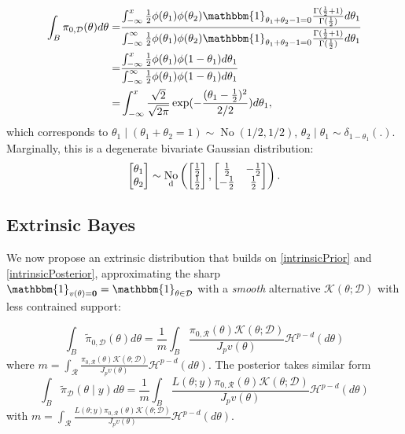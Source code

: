 \documentclass[10pt]{article}
\newcommand{\mc}[1]{\mathcal{#1}}
\DeclareMathOperator{\No}{No}
\DeclareMathOperator{\1}{\mathbbm{1}}
\begin{document}
\begin{equation*}
	\begin{aligned}
\int_{B} \pi_{0,\mc D}(\theta) d\theta= 
& \frac{
\int_{-\infty}^{x} \frac{1}{2}\phi(\theta_1)\phi(\theta_2)\mathbbm{1}_{\theta_1+\theta_2-1=0} \frac{\Gamma(\frac{1}{2}+1)}{\Gamma(\frac{1}{2})}  d\theta_1  
}{\int_{-\infty}^{\infty}\frac{1}{2}\phi(\theta_1)\phi(\theta_2) \mathbbm{1}_{\theta_1+\theta_2-1=0}  \frac{\Gamma(\frac{1}{2}+1)}{\Gamma(\frac{1}{2})}   d\theta_1} \\ 
=& \frac{
\int_{-\infty}^{x}\frac{1}{2}\phi(\theta_1)\phi(1-\theta_1)d\theta_1  
}{
\int_{-\infty}^{\infty}\frac{1}{2}\phi(\theta_1)\phi(1-\theta_1)d\theta_1  } \\ 
= & \int_{-\infty}^{x} \frac{\sqrt{2}}{\sqrt{2\pi}} \exp(-\frac{(\theta_1-\frac{1}{2})^2}{2/2}) d\theta_1,
\end{aligned}
\end{equation*}
which corresponds to $\theta_1\mid (\theta_1+ \theta_2=1) \sim \No(1/2,1/2)$, $\theta_2\mid \theta_1 \sim \delta_{1-\theta_1}(.)$. Marginally, this is a degenerate bivariate Gaussian distribution:
$$\begin{bmatrix} \theta_1 \\ \theta_2 \end{bmatrix} \sim
\No_{\text d} \left(
 \begin{bmatrix} \frac{1}{2} \\ \frac{1}{2} \end{bmatrix},
\begin{bmatrix} \frac{1}{2} & -\frac{1}{2}  \\  -\frac{1}{2}  & \frac{1}{2} \end{bmatrix}
\right).$$



\subsection{Extrinsic Bayes}
We now propose an extrinsic distribution that builds on \eqref{intrinsicPrior} and \eqref{intrinsicPosterior}, approximating the sharp $\mathbbm{1}_{v(\theta)= \bf 0}=\mathbbm{1}_{\theta\in \mc D}$ with a {\em smooth} alternative $\mc{K}( \theta; \mc D)$ with less contrained support:


\begin{equation}
\label{extrinsicPrior}
	\int_{B}\tilde \pi_{0,\mc D}(\theta)d\theta= \frac{1}{m}\int_{B} \frac{\pi_{0,\mc R}(\theta) \mc{K}( \theta; \mc D)   }{J_p v(\theta)}\mc H^{p-d}(d\theta)
\end{equation}
where $m=\int_{\mc R} \frac{\pi_{0,\mc R}(\theta) \mc{K}( \theta; \mc D)   }{J_p v(\theta)}\mc H^{p-d}(d\theta)$. The posterior takes similar form
\begin{equation}
\label{extrinsicPosterior}
	\int_{B}\tilde \pi_{\mc D}(\theta \mid y)d\theta= \frac{1}{m}\int_{B} \frac{L(\theta;y)\pi_{0,\mc R}(\theta) \mc{K}( \theta; \mc D)   }{J_p v(\theta)}\mc H^{p-d}(d\theta)
\end{equation}
with $m=	\int_{\mc R} \frac{L(\theta;y)\pi_{0,\mc R}(\theta) \mc{K}( \theta; \mc D)   }{J_p v(\theta)}\mc H^{p-d}(d\theta)$.
 
\end{document}
